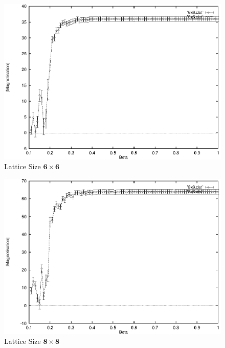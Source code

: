\documentclass[a4paper]{IEEEtran}
\begin{document}
    \begin{figure} 
    \caption{Lattice Size $\mathbf{6 \times 6}$}
    \label{fig:6x6-2} 
    \begin{center}
        \includegraphics[width=\columnwidth]{6x6_2.eps}
    \end{center}
    \end{figure} 

    \begin{figure} 
    \caption{Lattice Size $\mathbf{8 \times 8}$}
    \label{fig:8x8-2} 
    \begin{center}
        \includegraphics[width=\columnwidth]{8x8_2.eps}
    \end{center}
    \end{figure} 
\end{document}
